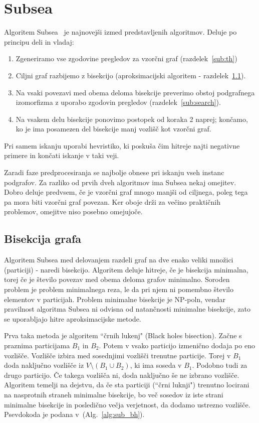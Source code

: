 \documentclass[a4paper, 12pt, ]{book}
\newcommand{\refalg}[1]{(Alg.~\ref{#1})}
\begin{document}
\chapter{Subsea}
	Algoritem Subsea~\cite{subsea} je najnovejši izmed predstavljenih algoritmov. Deluje po principu deli in vladaj:
	\begin{enumerate}
		\item Zgeneriramo vse zgodovine pregledov za vzorčni graf (razdelek~\ref{sub:th})
		\item Ciljni graf razbijemo z bisekcijo (aproksimacijski algoritem - razdelek~\ref{sub:bisect}).
		\item Na vsaki povezavi med obema deloma bisekcije preverimo obstoj podgrafnega izomorfizma z uporabo zgodovin pregledov 
			(razdelek~\ref{sub:search}).
		\item Na vsakem delu bisekcije ponovimo postopek od koraka 2 naprej; končamo, ko je ima posamezen del bisekcije manj vozlišč kot vzorčni graf.
	\end{enumerate}
	Pri samem iskanju uporabi hevristiko, ki poskuša čim hitreje najti negativne primere in končati iskanje v taki veji.
	
	Zaradi faze predprocesiranja se najbolje obnese pri iskanju vseh instanc podgrafov. Za razliko od prvih dveh algoritmov ima Subsea nekaj omejitev. 
	Dobro deluje predvsem, če je vzorčni graf mnogo manjši od ciljnega, poleg tega pa mora biti vzorčni graf povezan. Ker oboje drži za večino praktičnih
	problemov, omejitve niso posebno omejujoče. 

	\section{Bisekcija grafa}
	\label{sub:bisect}
	Algoritem Subsea med delovanjem razdeli graf na dve enako veliki množici (particiji) - naredi bisekcijo. Algoritem deluje hitreje, če je bisekcija 
	minimalna, torej če je število povezav med obema deloma grafov minimalno. Soroden problem je problem minimalnega reza, le da pri njem ni 
	pomembno število elementov v particijah. Problem minimalne bisekcije je NP-poln, vendar pravilnost algoritma Subsea ni odvisna od natančnosti
	minimalne bisekcije, zato se uporabljajo hitre aproksimacijske metode.

	Prva taka metoda je  algoritem ``črnih lukenj" (Black holes bisection). Začne s praznima particijama $B_1$ in $B_2$. Potem v vsako particijo izmenično
	dodaja po eno vozlišče.
	Vozlišče izbira med sosednjimi vozlišči trenutne particije. Torej v $B_1$ doda naključno vozlišče iz $V \setminus (B_1 \cup B_2)$, ki ima soseda v $B_1$.
	Podobno tudi za drugo particijo. Če takega vozlišča ni, doda naključno še ne izbrano vozlišče. Algoritem temelji na dejstvu, da če sta particiji (``črni 
	luknji") trenutno locirani na 	nasprotnih straneh minimalne bisekcije, bo več sosedov iz iste strani minimalne bisekcije in posledično večja verjetnost, da
	dodamo ustrezno vozlišče. Psevdokoda je podana v~\refalg{alg:sub_bh}.
\end{document}
